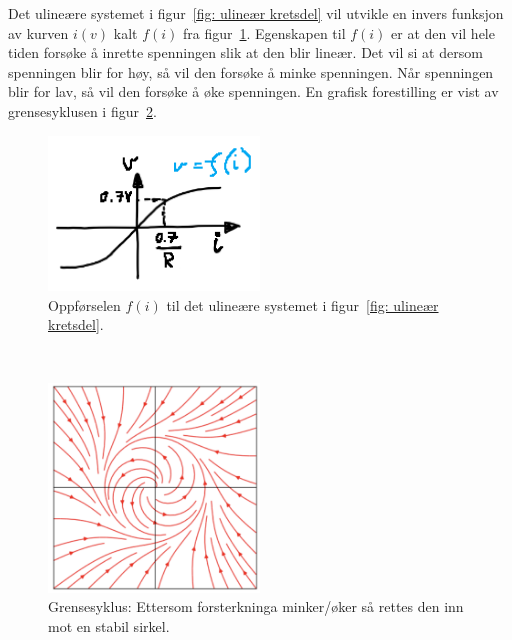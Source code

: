 \documentclass[a4paper,11pt,norsk]{article}
\begin{document}
\newpage
Det ulineære systemet i figur~\ref{fig: ulineær kretsdel} vil utvikle en invers funksjon av kurven $i(v)$ kalt $f(i)$ fra figur~\ref{fig: f(i) kurve}. Egenskapen til $f(i)$ er at den vil hele tiden forsøke å inrette spenningen slik at den blir lineær. Det vil si at dersom spenningen blir for høy, så vil den forsøke å minke spenningen. Når spenningen blir for lav, så vil den forsøke å øke spenningen. En grafisk forestilling er vist av grensesyklusen i figur~\ref{fig: fasediagram}.
\begin{figure}[htbp]
    \centering
    \includegraphics[width=0.5\textwidth]{img/f_i diode kurve.png}
    \caption{Oppførselen $f(i)$ til det ulineære systemet i figur~\ref{fig: ulineær kretsdel}.}
    \label{fig: f(i) kurve}
\end{figure}\\

\begin{figure}[!htbp]
    \centering
    \includegraphics[width=0.5\textwidth]{img/Grensesyklus.png}
    \caption{Grensesyklus: Ettersom forsterkninga minker/øker så rettes den inn mot en stabil sirkel.}
    \label{fig: fasediagram}
\end{figure} \\
\end{document}
